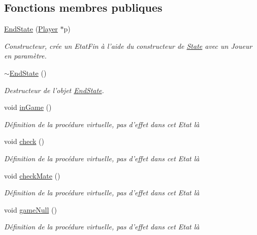 \subsection*{Fonctions membres publiques}
\begin{DoxyCompactItemize}
\item 
\hyperlink{class_end_state_a0c74d371934fe30dd66ad3275b0ca98e}{End\-State} (\hyperlink{class_player}{Player} $\ast$p)
\begin{DoxyCompactList}\small\item\em Constructeur, crée un Etat\-Fin à l'aide du constructeur de \hyperlink{class_state}{State} avec un Joueur en paramètre. \end{DoxyCompactList}\item 
\hyperlink{class_end_state_a201636e52f201f6f34318c152139e2e1}{$\sim$\-End\-State} ()
\begin{DoxyCompactList}\small\item\em Destructeur de l'objet \hyperlink{class_end_state}{End\-State}. \end{DoxyCompactList}\item 
void \hyperlink{class_end_state_a6ba5aa5cfd2d0ac4aa1609e336d5669f}{in\-Game} ()
\begin{DoxyCompactList}\small\item\em Définition de la procédure virtuelle, pas d'effet dans cet Etat là \end{DoxyCompactList}\item 
void \hyperlink{class_end_state_a80e538c38c1293803200e5d3b513ba77}{check} ()
\begin{DoxyCompactList}\small\item\em Définition de la procédure virtuelle, pas d'effet dans cet Etat là \end{DoxyCompactList}\item 
void \hyperlink{class_end_state_a48a2531ee4bd2144b44823a5527488f3}{check\-Mate} ()
\begin{DoxyCompactList}\small\item\em Définition de la procédure virtuelle, pas d'effet dans cet Etat là \end{DoxyCompactList}\item 
void \hyperlink{class_end_state_ad50c108e27c7b0497c3f2f2e76b904a5}{game\-Null} ()
\begin{DoxyCompactList}\small\item\em Définition de la procédure virtuelle, pas d'effet dans cet Etat là \end{DoxyCompactList}\item 

\end{DoxyCompactItemize}
